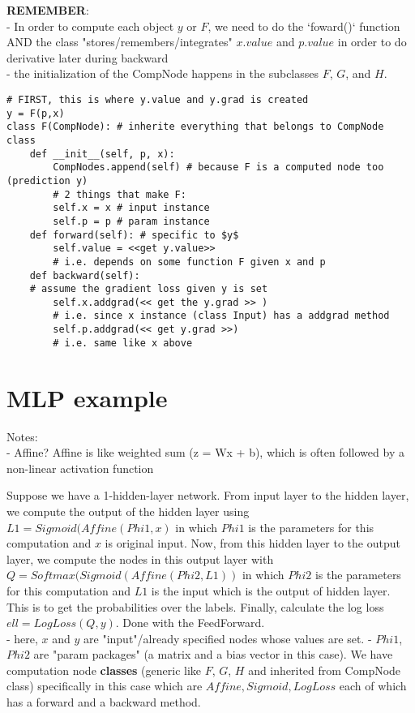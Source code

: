 \documentclass{article}
\begin{document}
\textbf{REMEMBER}: \\
- In order to compute each object $y$ or $F$, we need to do the `foward()` function AND the class "stores/remembers/integrates" $x.value$ and $p.value$ in order to do derivative later during backward\\
- the initialization of the CompNode happens in the subclasses $F$, $G$, and $H$.
\begin{verbatim}
# FIRST, this is where y.value and y.grad is created
y = F(p,x)
class F(CompNode): # inherite everything that belongs to CompNode class
    def __init__(self, p, x):
        CompNodes.append(self) # because F is a computed node too (prediction y)
        # 2 things that make F:
        self.x = x # input instance
        self.p = p # param instance
    def forward(self): # specific to $y$
        self.value = <<get y.value>> 
        # i.e. depends on some function F given x and p
    def backward(self):
    # assume the gradient loss given y is set
        self.x.addgrad(<< get the y.grad >> ) 
        # i.e. since x instance (class Input) has a addgrad method
        self.p.addgrad(<< get y.grad >>) 
        # i.e. same like x above
\end{verbatim}
\section{MLP example}

Notes:\\
- Affine? Affine is like weighted sum (z = Wx + b), which is often followed by a non-linear activation function

Suppose we have a 1-hidden-layer network. From input layer to the hidden layer, we compute the output of the hidden layer using $L1=Sigmoid(Affine(Phi1, x)$ in which $Phi1$ is the parameters for this computation and $x$ is original input. Now, from this hidden layer to the output layer, we compute the nodes in this output layer with $Q=Softmax(Sigmoid(Affine(Phi2, L1))$ in which $Phi2$ is the parameters for this computation and $L1$ is the input which is the output of hidden layer. This is to get the probabilities over the labels. Finally, calculate the log loss $ell = LogLoss(Q,y)$. Done with the FeedForward.\\

- here, $x$ and $y$ are "input"/already specified nodes whose values are set. 
- $Phi1$, $Phi2$ are "param packages" (a matrix and a bias vector in this case). We have computation node \textbf{classes} (generic like $F$, $G$, $H$ and inherited from CompNode class) specifically in this case which are $Affine, Sigmoid, LogLoss$ each of which has a forward and a backward method.
\end{document}
